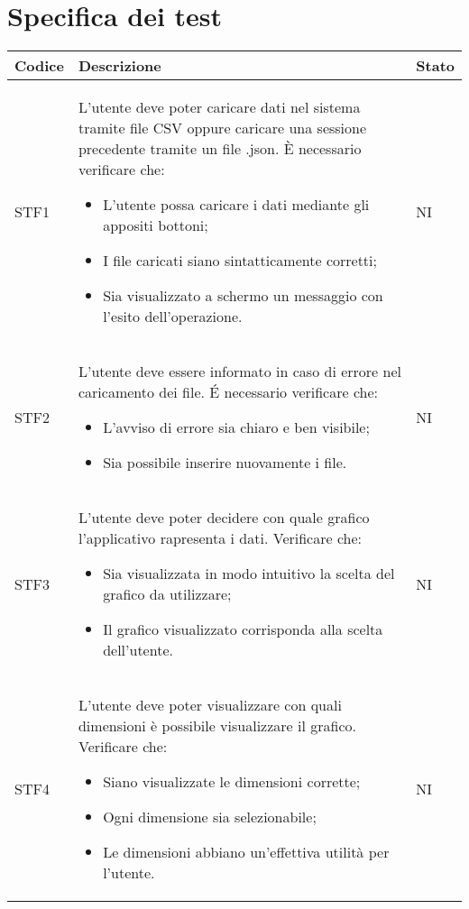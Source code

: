 \section{Specifica dei test}
    \begin{longtable}{|p{1.5cm}|p{11cm}|p{1cm}|} \hline
      \textbf{Codice} & \textbf{Descrizione} & \textbf{Stato} \\ \hline
        STF1 & L'utente deve poter caricare dati nel sistema tramite file CSV oppure caricare una sessione precedente tramite un file .json. \`E necessario verificare che: \begin{itemize}
            \item L'utente possa caricare i dati mediante gli appositi bottoni;
            \item I file caricati siano sintatticamente corretti;
            \item Sia visualizzato a schermo un messaggio con l'esito dell'operazione.
        \end{itemize} & NI\\ \hline

        STF2 & L'utente deve essere informato in caso di errore nel caricamento dei file. \'E necessario verificare che: \begin{itemize}
            \item L'avviso di errore sia chiaro e ben visibile;
            \item Sia possibile inserire nuovamente i file.
        \end{itemize} & NI\\ \hline

        STF3 & L'utente deve poter decidere con quale grafico l'applicativo rapresenta i dati. Verificare che: \begin{itemize}
            \item Sia visualizzata in modo intuitivo la scelta del grafico da utilizzare;
            \item Il grafico visualizzato corrisponda alla scelta dell'utente.
        \end{itemize} & NI\\ \hline

        STF4 & L'utente deve poter visualizzare con quali dimensioni è possibile visualizzare il grafico. Verificare che: \begin{itemize}
            \item Siano visualizzate le dimensioni corrette;
            \item Ogni dimensione sia selezionabile;
            \item Le dimensioni abbiano un'effettiva utilità per l'utente.
        \end{itemize} & NI\\ \hline


\end{longtable}
